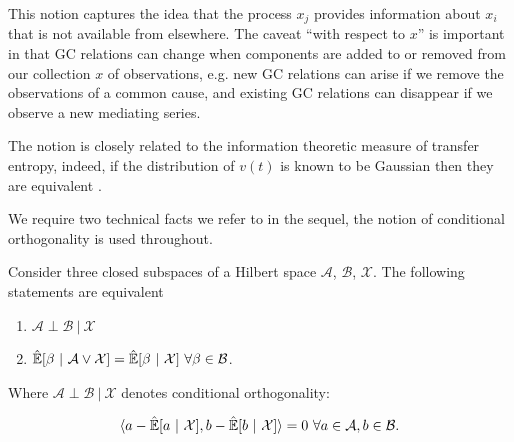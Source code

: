 \documentclass[12pt]{article}
\newcommand{\linE}[2]{\hat{\E}[#1\ |\ #2]}  %
\begin{document}
This notion captures the idea that the process $x_j$ provides
information about $x_i$ that is not available from elsewhere.  The
caveat ``with respect to $x$'' is important in that GC relations can
change when components are added to or removed from our collection $x$
of observations, e.g. new GC relations can arise if we remove the
observations of a common cause, and existing GC relations can
disappear if we observe a new mediating series.

The notion is closely related to the information theoretic measure of
transfer entropy, indeed, if the distribution of $v(t)$ is known to be
Gaussian then they are equivalent \cite{barnett2009granger}.

We require two technical facts we refer to in the sequel, the notion
of conditional orthogonality is used throughout.

\begin{lemma}
  \label{lem:conditional_orthogonality_equivalence}
  Consider three closed subspaces of a Hilbert space $\mathcal{A}$,
  $\mathcal{B}$, $\mathcal{X}$.  The following statements are
  equivalent

  \begin{enumerate}
    \item{$\mathcal{A} \perp \mathcal{B}\ |\ \mathcal{X}$}
    \item{$\linE{\beta}{\mathcal{A} \vee \mathcal{X}} = \linE{\beta}{\mathcal{X}}\ \forall \beta \in \mathcal{B}$.}
    \end{enumerate}

    Where $\mathcal{A} \perp \mathcal{B}\ |\ \mathcal{X}$ denotes
    conditional orthogonality:

    \begin{equation*}
      \inner{a - \linE{a}{\mathcal{X}}}{b - \linE{b}{\mathcal{X}}} = 0\ \forall a \in \mathcal{A}, b \in \mathcal{B}.
    \end{equation*}
\end{lemma}
\end{document}
